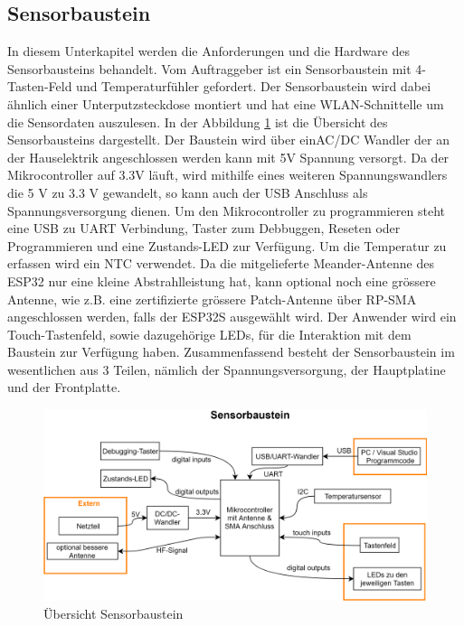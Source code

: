\subsection{Sensorbaustein}\label{subsec: Sensorbaustein}
\label{sec: Sensorbaustein}
In diesem Unterkapitel werden die Anforderungen und die Hardware des Sensorbausteins behandelt.
Vom Auftraggeber ist ein Sensorbaustein mit 4-Tasten-Feld und Temperaturfühler gefordert. Der Sensorbaustein wird dabei ähnlich einer Unterputzsteckdose montiert und hat eine WLAN-Schnittelle um die Sensordaten auszulesen. In der Abbildung \ref{pic: Uebersicht_Sensorbaustein} ist die Übersicht des Sensorbausteins dargestellt. Der Baustein wird über einAC/DC Wandler der an der Hauselektrik angeschlossen werden kann mit 5V Spannung versorgt. Da der Mikrocontroller auf 3.3V läuft, wird mithilfe eines weiteren Spannungswandlers die 5 V zu 3.3 V gewandelt, so kann auch der USB Anschluss als Spannungsversorgung dienen. Um den Mikrocontroller zu programmieren steht eine USB zu UART Verbindung, Taster zum Debbuggen, Reseten oder Programmieren und eine Zustands-LED zur Verfügung. Um die Temperatur zu erfassen wird ein NTC verwendet. Da die mitgelieferte Meander-Antenne des ESP32 nur eine kleine Abstrahlleistung hat, kann optional noch eine grössere Antenne, wie z.B. eine zertifizierte grössere Patch-Antenne über RP-SMA angeschlossen werden, falls der ESP32S ausgewählt wird. Der Anwender wird ein Touch-Tastenfeld, sowie dazugehörige LEDs, für die Interaktion mit dem Baustein zur Verfügung haben. Zusammenfassend besteht der Sensorbaustein im wesentlichen aus 3 Teilen, nämlich der Spannungsversorgung, der Hauptplatine und der Frontplatte.

\begin{figure}[H]
	\centering
	\includegraphics[width=\textwidth]{graphics/Sensorbaustein.png}
	\caption{Übersicht Sensorbaustein}
	\label{pic: Uebersicht_Sensorbaustein}
\end{figure} 

